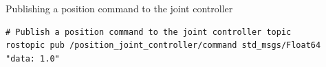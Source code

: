 \documentclass[../../main]{subfiles}
\begin{document}
  \begin{codebox}[]{Publishing a position command to the joint controller}
    \begin{verbatim}
# Publish a position command to the joint controller topic
rostopic pub /position_joint_controller/command std_msgs/Float64 "data: 1.0"
    \end{verbatim}
  \end{codebox}
\end{document}
